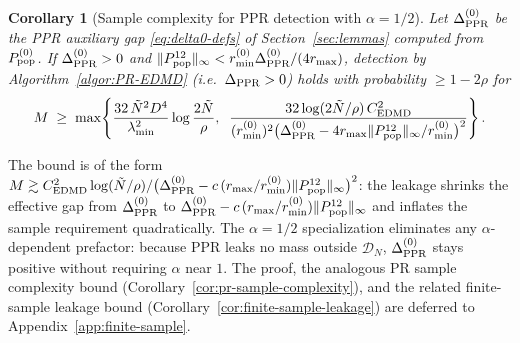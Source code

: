 \documentclass{article}
\theoremstyle{plain}
\newtheorem{corollary}{Corollary}[theorem]
\theoremstyle{definition}
\def\Dc{\mathcal{D}}
\newcommand{\arXivtag}[1][]{#1}
\begin{document}
\begin{corollary}[Sample complexity for PPR detection with $\alpha=1/2$]\label{cor:sample-complexity}
	Let $\Delta^{(0)}_{\textnormal{PPR}}$ be the PPR auxiliary gap \eqref{eq:delta0-defs} of Section~\ref{sec:lemmas} computed from $P^{(0)}_{\textnormal{pop}}$.
	If $\Delta^{(0)}_{\textnormal{PPR}} > 0$ and $\|P_{\textnormal{pop}}^{12}\|_\infty < r^{(0)}_{\min}\Delta^{(0)}_{\textnormal{PPR}}/(4 r_{\max})$, detection by Algorithm~\ref{algor:PR-EDMD} (i.e.\ $\Delta_{\textnormal{PPR}} > 0$) holds with probability $\geq 1-2\rho$ for
	\begin{equation}\label{eq:ppr-sample-complexity}
		M \;\geq\; \max\!\left\{ \frac{32\,\tilde{N}^2 D^4}{\lambda_{\min}^2}\log\frac{2\tilde{N}}{\rho},\;\; \frac{32\log(2\tilde{N}/\rho)\, C_{\text{EDMD}}^2}{(r^{(0)}_{\min})^2\bigl(\Delta^{(0)}_{\textnormal{PPR}} - 4 r_{\max}\|P_{\textnormal{pop}}^{12}\|_\infty/r^{(0)}_{\min}\bigr)^2}\right\}.
	\end{equation}
\end{corollary}


The bound is of the form $M \gtrsim C_{\text{EDMD}}^2\log(\tilde N/\rho)/\bigl(\Delta^{(0)}_{\textnormal{PPR}} - c\,(r_{\max}/r^{(0)}_{\min})\|P_{\textnormal{pop}}^{12}\|_\infty\bigr)^2$: the leakage shrinks the effective gap from $\Delta^{(0)}_{\textnormal{PPR}}$ to $\Delta^{(0)}_{\textnormal{PPR}} - c\,(r_{\max}/r^{(0)}_{\min})\|P_{\textnormal{pop}}^{12}\|_\infty$ and inflates the sample requirement quadratically. The $\alpha = 1/2$ specialization eliminates any $\alpha$-dependent prefactor: because PPR leaks no mass outside \arXivtag[$\Dc_N$], $\Delta^{(0)}_{\textnormal{PPR}}$ stays positive without requiring $\alpha$ near $1$. The proof, the analogous PR sample complexity bound (Corollary~\ref{cor:pr-sample-complexity}), and the related finite-sample leakage bound (Corollary~\ref{cor:finite-sample-leakage}) are deferred to Appendix~\ref{app:finite-sample}.

	\vspace{-0.1cm}
\end{document}
